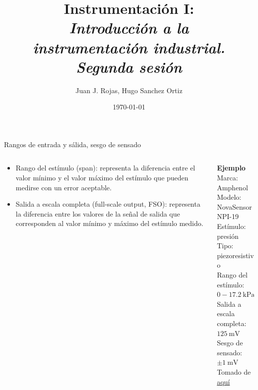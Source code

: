 \documentclass[aspectratio=169]{beamer}
\title{Instrumentación I: \\ \emph{Introducción a la }\\ \emph{instrumentación industrial.} \\ \emph{Segunda sesión}}
\author{
    Juan J. Rojas, Hugo Sanchez Ortiz
}
\institute{Instituto Tecnológico de Costa Rica}
\date{\today}
\begin{document}

\maketitle

\newcommand{\blackandwhite}{white} %

\begin{frame}{Rangos de entrada y sálida, sesgo de sensado}
    \begin{columns}[c, onlytextwidth]
        \begin{column}{0.50\textwidth}
            \begin{itemize}
                \item Rango del estímulo (span): representa la diferencia entre el valor mínimo y el valor máximo del estímulo que pueden medirse con un error aceptable.
                \item Salida a escala completa (full-scale output, FSO): representa la diferencia entre los valores de la señal de salida que corresponden al valor mínimo y máximo del estímulo medido. 
            \end{itemize}
        \end{column}
        \begin{column}{0.45\textwidth}
            \textbf{Ejemplo}\\[4pt]
            Marca: Amphenol\\[4pt]
            Modelo: NovaSensor NPI-19\\[4pt]
            Estímulo: presión\\[4pt]
            Tipo: piezoresistivo\\[4pt]
            Rango del estímulo: $0  - \SI{17.2}{\kilo\pascal}$\\[4pt]
            Salida a escala completa: $\SI{125}{\milli\volt}$\\[4pt]
            Sesgo de sensado: $\pm \SI{1}{\milli\volt}$\\[10pt]
            \tiny{Tomado de \href{https://f.hubspotusercontent40.net/hubfs/9035299/Product\%20Documents/AAS-920-298B-NovaSensor\%20NPI-19-REVISED-061714-web\%20(1).pdf}{aquí}}
        \end{column}
    \end{columns}
\end{frame}
\end{document}
